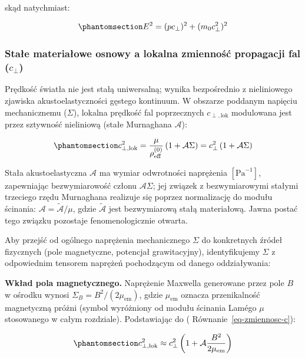 \documentclass[
  polish,
  letterpaper,
  DIV=11,
  numbers=noendperiod,
  oneside]{scrartcl}
\begin{document}
skąd natychmiast:

\begin{equation}\protect\phantomsection\label{eq-1-4-16}{E^2 = (pc_{\perp})^2 + (m_0 c_{\perp}^2)^2}\end{equation}

\subsubsection{\texorpdfstring{Stałe materiałowe osnowy a lokalna
zmienność propagacji fal
(\(c_{\perp}\))}{Stałe materiałowe osnowy a lokalna zmienność propagacji fal (c\_\{\textbackslash perp\})}}\label{sec-1-4-5}

Prędkość światła nie jest stałą uniwersalną; wynika bezpośrednio z
nieliniowego zjawiska akustoelastyczności gęstego kontinuum. W obszarze
poddanym napięciu mechanicznemu (\(\Sigma\)), lokalna prędkość fal
poprzecznych \(c_{\perp,\text{lok}}\) modulowana jest przez sztywność
nieliniową (stałe Murnaghana \(\mathcal{A}\)):

\begin{equation}\protect\phantomsection\label{eq-zmiennosc-c}{c_{\perp,\text{lok}}^2 = \frac{\mu}{\rho_{\text{eff}}^{(0)}} \left( 1 + \mathcal{A} \Sigma \right) = c_{\perp}^2 \left( 1 + \mathcal{A} \Sigma \right)}\end{equation}

Stała akustoelastyczna \(\mathcal{A}\) ma wymiar odwrotności naprężenia
\([\text{Pa}^{-1}]\), zapewniając bezwymiarowość członu
\(\mathcal{A}\Sigma\); jej związek z bezwymiarowymi stałymi trzeciego
rzędu Murnaghana realizuje się poprzez normalizację do modułu ścinania:
\(\mathcal{A} = \tilde{\mathcal{A}}/\mu\), gdzie \(\tilde{\mathcal{A}}\)
jest bezwymiarową stałą materiałową. Jawna postać tego związku pozostaje
fenomenologicznie otwarta.

Aby przejść od ogólnego naprężenia mechanicznego \(\Sigma\) do
konkretnych źródeł fizycznych (pole magnetyczne, potencjał
grawitacyjny), identyfikujemy \(\Sigma\) z odpowiednim tensorem naprężeń
pochodzącym od danego oddziaływania:

\textbf{Wkład pola magnetycznego.} Naprężenie Maxwella generowane przez
pole \(B\) w ośrodku wynosi \(\Sigma_B = B^2/(2\mu_\text{em})\), gdzie
\(\mu_\text{em}\) oznacza przenikalność magnetyczną próżni (symbol
wyróżniony od modułu ścinania Lamégo \(\mu\) stosowanego w całym
rozdziale). Podstawiając do ( Równanie~\ref{eq-zmiennosc-c}):

\begin{equation}\protect\phantomsection\label{eq-1-4-5-wz1}{c_{\perp,\text{lok}}^2 \approx c_{\perp}^2\left(1 + \mathcal{A}\frac{B^2}{2\mu_{\text{em}}}\right)}\end{equation}
\end{document}
